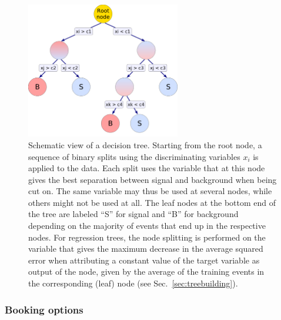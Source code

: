 \begin{figure}[t]
  \begin{center}
          \includegraphics[width=0.60\textwidth]{plots/BDTsketch}
  \end{center}
  \vspace{-0.3cm}
  \caption[.]{Schematic view of a decision tree.  Starting from the
    root node, a sequence of binary splits using the discriminating
    variables $x_i$ is applied to the data. Each split uses the
    variable that at this node gives the best separation between
    signal and background when being cut on.  The same variable may
    thus be used at several nodes, while others might not be used at
    all.  The leaf nodes at the bottom end of the tree are labeled
    ``S'' for signal and ``B'' for background depending on the
    majority of events that end up in the respective nodes. For
    regression trees, the node splitting is performed on the variable
    that gives the maximum decrease in the average squared error when
    attributing a constant value of the target variable as
    output of the node, given by the average of the training events in
    the corresponding (leaf) node (see Sec.~\ref{sec:treebuilding}). }
\label{fig:decisiontree}
\end{figure}

\subsubsection{Booking options}

